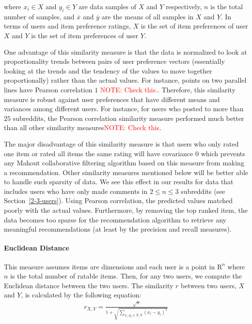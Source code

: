 \documentclass{article}
\begin{document}
where $x_i \in X$ and $y_i \in Y$ are data samples of $X$ and $Y$ respectively, $n$ is the total number of samples,
and $\overline{x}$ and $\overline{y}$ are the means of all samples in $X$ and $Y$. In terms of users and 
item preference ratings, $X$ is the set of item preferences of user $X$ and $Y$ is the set of item 
preferences of user $Y$. 

One advantage of this similarity measure is that the data is normalized to look at proportionality trends between 
pairs of user preference vectors (essentially looking at the trends and the tendency of the values to move 
together proportionally) rather than the actual values. For instance, points on two parallel lines have Pearson 
correlation $1$ \textcolor{red}{NOTE: Check this.}. Therefore, this similarity measure is robust against user preferences that have different means and variances among different users. For instance, for users who
posted to more than $25$ subreddits, the Pearson correlation similarity measure performed much
better than all other similarity measures\textcolor{red}{NOTE: Check this}.

The major disadvantage of this similarity measure is that users who only rated one item or rated all items the 
same rating will have covariance $0$ which prevents any Mahout collaborative filtering algorithm based 
on this measure from making a recommendation. Other similarity measures mentioned below will be better able
to handle such sparsity of data. We see this effect in our results for data that includes users who have
only made comments in $2 \leq n \leq 3$ subreddits (see Section~\ref{2-3-users}). 
Using Pearson correlation, the predicted values matched poorly
with the actual values. Furthermore, by removing the top ranked item, the data becomes too sparse for the recommendation algorithm to retrieve any meaningful recommendations (at least by the precision and recall measures).

\paragraph{Euclidean Distance}

This measure assumes items are dimensions and each user is a point in $\mathrm{R}^n$ where $n$ is the total
number of ratable items. Then, for any two users, we compute the Euclidean distance between the two users.
The similarity $r$ between two users, $X$ and $Y$, is calculated by the following equation: \begin{align*}
r_{X, Y} = \frac{\sqrt{n}}{1 + \sqrt{\sum_{x_i, y_i \in X, Y} (x_i - y_i)^2}}
\end{align*}
\end{document}

